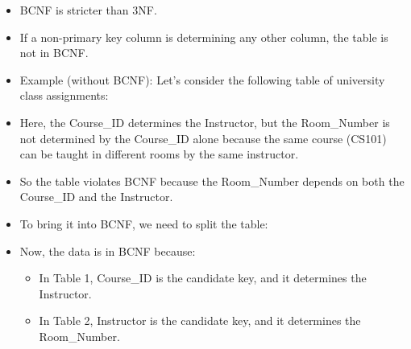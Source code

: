 \setlength{\columnsep}{3pt}
\begin{flushleft}
	
	\begin{itemize}
		\item BCNF is stricter than 3NF.
		\item If a non-primary key column is determining any other column, the table is not in BCNF.
		
		\item Example (without BCNF):
		Let’s consider the following table of university class assignments:
		
			
		\item Here, the Course\_ID determines the Instructor, but the Room\_Number is not determined by the Course\_ID alone because the same course (CS101) can be taught in different rooms by the same instructor. 
		\item So the table violates BCNF because the Room\_Number depends on both the Course\_ID and the Instructor.
		
		\item To bring it into BCNF, we need to split the table:
		
		
		\item Now, the data is in BCNF because:
		
		\begin{itemize}
			\item In Table 1, Course\_ID is the candidate key, and it determines the Instructor.
			\item In Table 2, Instructor is the candidate key, and it determines the Room\_Number.
			
		\end{itemize}
			

	\end{itemize}

\end{flushleft}
\newpage


